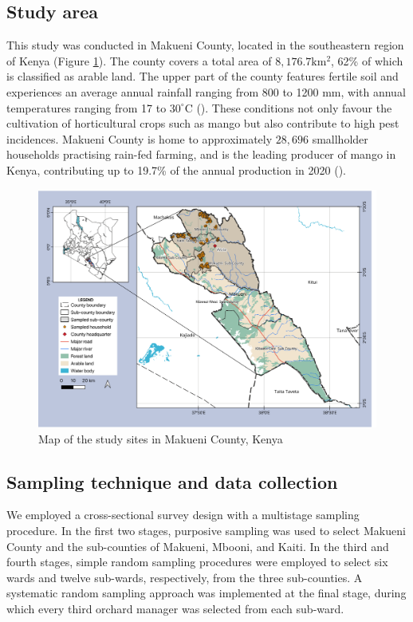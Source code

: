 \documentclass[fleqn,twoside,reqno]{article}
\begin{document}
\subsection{Study area}
This study was conducted in Makueni County, located in the southeastern region of Kenya (Figure \ref{fig:1}). The county covers a total area of $8,176.7\mathrm{km^2}$, 62\% of which is classified as arable land. The upper part of the county features fertile soil and experiences an average annual rainfall ranging from 800 to 1200 mm, with annual temperatures ranging from 17 to $30^\circ$C (\cite{County2022}). These conditions not only favour the cultivation of horticultural crops such as mango but also contribute to high pest incidences. Makueni County is home to approximately $28,696$ smallholder households practising rain-fed farming, and is the leading producer of mango in Kenya, contributing up to 19.7\% of the annual production in 2020 (\cite{HCD2021}).
\begin{figure}[!ht]
  \centering
  \includegraphics[width=1\textwidth]{Fig.1.png}
  \caption{Map of the study sites in Makueni County, Kenya}
  \label{fig:1}
\end{figure}

\subsection{Sampling technique and data collection}
We employed a cross-sectional survey design with a multistage sampling procedure. In the first two stages, purposive sampling was used to select Makueni County and the sub-counties of Makueni, Mbooni, and Kaiti. In the third and fourth stages, simple random sampling procedures were employed to select six wards and twelve sub-wards, respectively, from the three sub-counties. A systematic random sampling approach was implemented at the final stage, during which every third orchard manager was selected from each sub-ward.
\end{document}
